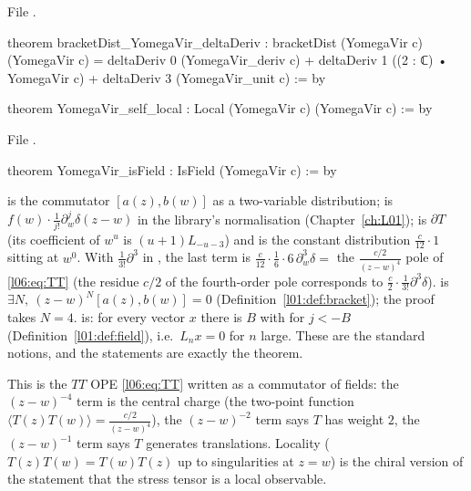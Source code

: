 File .
\begin{leancode}
theorem bracketDist_YomegaVir_deltaDeriv :
    bracketDist (YomegaVir c) (YomegaVir c)
      = deltaDeriv 0 (YomegaVir_deriv c) + deltaDeriv 1 ((2 : ℂ) • YomegaVir c)
        + deltaDeriv 3 (YomegaVir_unit c) := by

theorem YomegaVir_self_local : Local (YomegaVir c) (YomegaVir c) := by
\end{leancode}
File .
\begin{leancode}
theorem YomegaVir_isField : IsField (YomegaVir c) := by
\end{leancode}

\begin{dictionary}
 is the commutator $[a(z),b(w)]$ as a two-variable distribution;
 is $f(w)\cdot\frac{1}{j!}\partial_w^j\delta(z-w)$ in the library's normalisation
(Chapter~\ref{ch:L01});  is $\partial T$ (its coefficient of $w^u$ is
$(u+1)L_{-u-3}$) and  is the constant distribution $\frac{c}{12}\cdot1$ sitting at
$w^0$. With $\frac1{3!}\partial^3$ in , the last term is $\frac{c}{12}\cdot\frac{1}{6}
\cdot 6\,\partial^3_w\delta = $ the $\frac{c/2}{(z-w)^4}$ pole of \eqref{l06:eq:TT} (the residue $c/2$ of the
fourth-order pole corresponds to $\frac{c}{2}\cdot\frac{1}{3!}\partial^3\delta$).  is
$\exists N,\ (z-w)^N[a(z),b(w)] = 0$ (Definition~\ref{l01:def:bracket}); the proof takes $N = 4$.
 is: for every vector $x$ there is $B$ with  for $j<-B$
(Definition~\ref{l01:def:field}), i.e.\ $L_nx = 0$ for $n$ large. These are the standard notions, and the
statements are exactly the theorem.
\end{dictionary}

\begin{physics}
This is the $TT$ OPE \eqref{l06:eq:TT} written as a commutator of fields: the $(z-w)^{-4}$ term is the
central charge (the two-point function $\langle T(z)T(w)\rangle = \frac{c/2}{(z-w)^4}$), the
$(z-w)^{-2}$ term says $T$ has weight $2$, the $(z-w)^{-1}$ term says $T$ generates translations.
Locality ($T(z)T(w) = T(w)T(z)$ up to singularities at $z = w$) is the chiral version of the statement
that the stress tensor is a local observable.
\end{physics}

